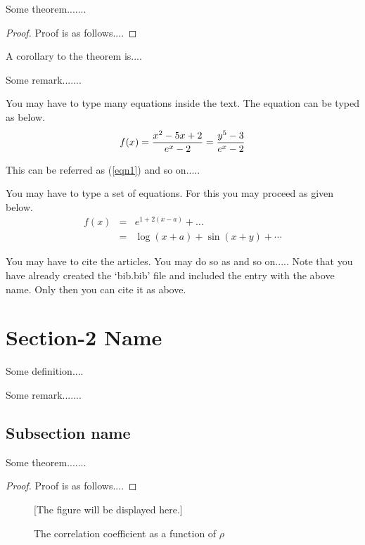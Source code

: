 \begin{theorem}
Some theorem.......
\end{theorem}

\begin{proof}
Proof is as follows....
\end{proof}


\begin{corollary}
A corollary to the theorem is....
\end{corollary}

\begin{remark}
Some remark.......
\end{remark}


You may have to type many equations inside the text.  The equation can be typed as below.
\begin{equation}\label{eqn1}
f(x) = \frac{x^2-5x+2}{e^x - 2} = {y^5-3 \over e^x-2} %
\end{equation}

This can be referred as (\ref{eqn1}) and so on.....

You may have to type a set of equations.  For this you may proceed as given below.
\begin{eqnarray}
f(x) &=& e^{1+2(x-a)} + \ldots   \nonumber   \\
  &=& \log(x+a) + \sin(x+y) + \cdots  \label{eqn2}
\end{eqnarray}


You may have to cite the articles.  You may do so as \cite{golub} and so on.....
Note that you have already created the `bib.bib' file and included the entry with the above name. Only
then you can cite it as above.  

\section{Section-2 Name}
\begin{definition}\label{abc}
Some definition....
\end{definition}

\begin{remark}
Some remark.......
\end{remark}

\subsection{Subsection name}

\begin{theorem}
Some theorem.......
\end{theorem}

\begin{proof}
Proof is as follows....
\end{proof}


\begin{figure}[h]

[The figure will be displayed here.]

\caption{The correlation coefficient as a function of $\rho$}
\end{figure}
